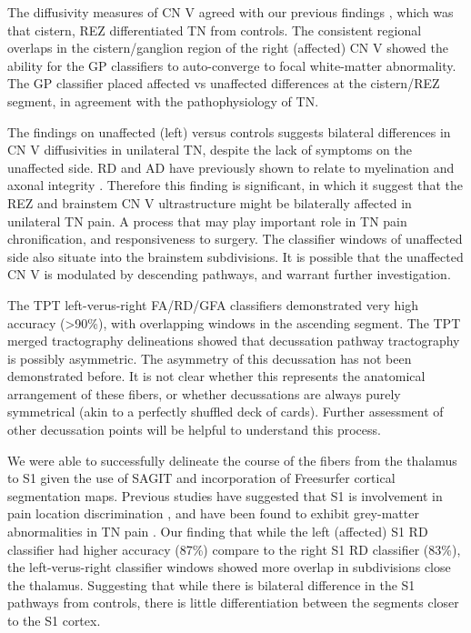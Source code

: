 The diffusivity measures of CN V agreed with our previous findings \cite{Chen2016a}, which was that cistern, REZ differentiated TN from controls. The consistent regional overlaps in the cistern/ganglion region of the right (affected) CN V showed the ability for the GP classifiers to auto-converge to focal white-matter abnormality. The GP classifier placed affected vs unaffected differences at the cistern/REZ segment, in agreement with the pathophysiology of TN. 

The findings on unaffected (left) versus controls suggests bilateral differences in CN V diffusivities in unilateral TN, despite the lack of symptoms on the unaffected side. RD and AD have previously shown to relate to myelination \cite{Song2002} and axonal integrity \cite{Budde2009}. Therefore this finding is significant, in which it suggest that the REZ and brainstem CN V ultrastructure might be bilaterally affected in unilateral TN pain. A process that may play important role in TN pain chronification, and responsiveness to surgery. The classifier windows of unaffected side also situate into the brainstem subdivisions. It is possible that the unaffected CN V is modulated by descending pathways, and warrant further investigation.

The TPT left-verus-right FA/RD/GFA classifiers demonstrated very high accuracy (>90\%), with overlapping windows in the ascending segment. The TPT merged tractography delineations showed that decussation pathway tractography is possibly asymmetric. The asymmetry of this decussation has not been demonstrated before. It is not clear whether this represents the anatomical arrangement of these fibers, or whether decussations are always purely symmetrical (akin to a perfectly shuffled deck of cards). Further assessment of other decussation points will be helpful to understand this process.  

We were able to successfully delineate the course of the fibers from the thalamus to S1 given the use of SAGIT and incorporation of Freesurfer cortical segmentation maps. Previous studies have suggested that S1 is involvement in pain location discrimination \cite{bushnell1999pain}, and have been found to exhibit grey-matter abnormalities in TN pain \cite{Desouza2013c}. Our finding that while the left (affected) S1 RD classifier had higher accuracy (87\%) compare to the right S1 RD classifier (83\%), the left-verus-right classifier windows showed more overlap in subdivisions close the thalamus. Suggesting that while there is bilateral difference in the S1 pathways from controls, there is little differentiation between the segments closer to the S1 cortex.


